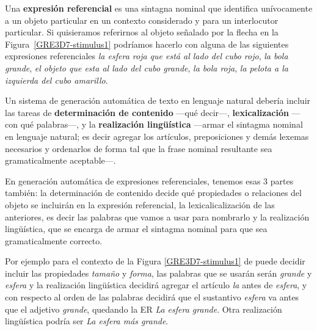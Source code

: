 Una {\bf expresi\'on referencial} es una sintagna nominal que identifica un\'ivocamente a un objeto particular en un contexto considerado y para un interlocutor particular. Si quisieramos referirnos al objeto se\~nalado por la flecha en la Figura~\ref{GRE3D7-stimulus1} podr\'iamos hacerlo con alguna de las siguientes expresiones referenciales
 {\it la esfera roja que est\'a al lado del cubo rojo}, {\it la bola grande}, {\it el objeto que esta al lado del cubo grande}, {\it la bola roja}, {\it la pelota a la izquierda del cubo amarillo}. 

Un sistema de generaci\'on autom\'atica de texto en lenguaje natural deber\'ia incluir 
las tareas de {\bf determinaci\'on de contenido} ---qu\'e decir---, {\bf lexicalizaci\'on} ---con qu\'e palabras---, y la {\bf realizaci\'on ling\"{u}\'istica} ---armar el sintagma nominal en lenguaje natural; es decir agregar los art\'iculos, preposiciones y dem\'as lexemas necesarios y ordenarlos de forma tal que la frase nominal resultante sea gramaticalmente aceptable---. 

En generaci\'on autom\'atica de expresiones referenciales, tenemos esas 3 partes tambi\'en: la determinaci\'on de contenido decide qu\'e propiedades o relaciones del objeto se incluir\'an en la expresi\'on referencial, la lexicalicalizaci\'on de las anteriores, es decir las palabras que vamos a usar para nombrarlo y la realizaci\'on ling\"u\'istica, que se encarga de armar el sintagma nominal para que sea gramaticalmente correcto.

Por ejemplo para el contexto de la Figura \ref{GRE3D7-stimulus1} de puede decidir incluir las propiedades {\it tama\~no} y {\it forma}, las palabras que se usar\'an ser\'an {\it grande} y {\it esfera} y la realizaci\'on ling\"u\'istica decidir\'a agregar el art\'iculo {\it la} antes de {\it esfera}, y con respecto al orden de las palabras decidir\'a que el sustantivo {\it esfera} va antes que el adjetivo {\it grande}, quedando la ER {\it La esfera grande}. Otra realizaci\'on ling\"u\'istica podr\'ia ser {\it La esfera m\'as grande}.
 
